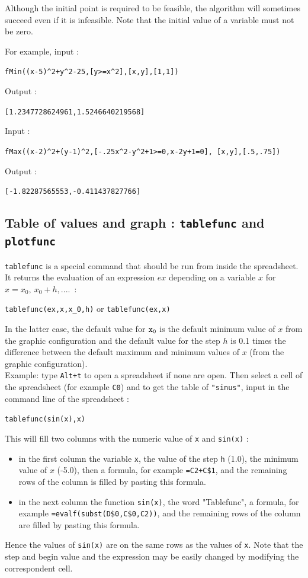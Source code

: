 \documentclass[a4paper,11pt]{book}
\begin{document}
Although the initial point is required to be feasible, the algorithm will sometimes succeed even if it is infeasible. Note that the initial value of a variable must not be zero.

For example, input :
\begin{center}
	\tt fMin((x-5)\verb|^|2+y\verb|^|2-25,[y>=x\verb|^|2],[x,y],[1,1])
\end{center}
Output :
\begin{center}
	\tt [1.2347728624961,1.5246640219568]
\end{center}
Input :
\begin{center}
	\tt fMax((x-2)\verb|^|2+(y-1)\verb|^|2,[-.25x\verb|^|2-y\verb|^|2+1>=0,x-2y+1=0],
	[x,y],[.5,.75])
\end{center}
Output :
\begin{center}
	\tt [-1.82287565553,-0.411437827766]
\end{center}

\subsection{Table of values and graph : {\tt tablefunc} and {\tt plotfunc}}   
{\tt tablefunc} is a special command that should be run from inside
the spreadsheet. It returns the evaluation of an expression $ex$ 
depending on a variable $x$ for $x=x_0,\ x_0+h,....$~:
\begin{center}
{\tt tablefunc(ex,x,x\_0,h)} or {\tt tablefunc(ex,x)}
\end{center}
In the latter case, the default value for ${\tt x_0}$
is the default minimum value of $x$ from the graphic configuration
and the default value for the step $h$ is 0.1 times the difference
between the default maximum and minimum values of $x$ (from the
graphic configuration).\\
Example: type {\tt Alt+t} to open a spreadsheet if none are open.
Then select a cell of the spreadsheet (for example {\tt C0}) and to get
the table of {\tt "sinus"}, input in the command line of the spreadsheet : 
\begin{center}{\tt tablefunc(sin(x),x)}\end{center}
This will fill two columns with the numeric value of {\tt x} and 
{\tt sin(x)} :
\begin{itemize}
\item in the first column the variable {\tt x}, 
the value of the step {\tt h}
(1.0),  the minimum value of $x$ (-5.0), then a formula, for example 
{\tt=C2+C\$1}, and the remaining rows 
of the column is filled by pasting this formula.
\item in the next column the function {\tt sin(x)}, the word
"Tablefunc", a formula, 
for example {\tt =evalf(subst(D\$0,C\$0,C2))}, and the remaining rows
of the column are filled by pasting this formula.
\end{itemize}
Hence the values of {\tt sin(x)} are on the same rows as the values 
of {\tt x}. Note that the step and begin value and the expression 
may be easily changed by modifying the correspondent cell.
\end{document}
